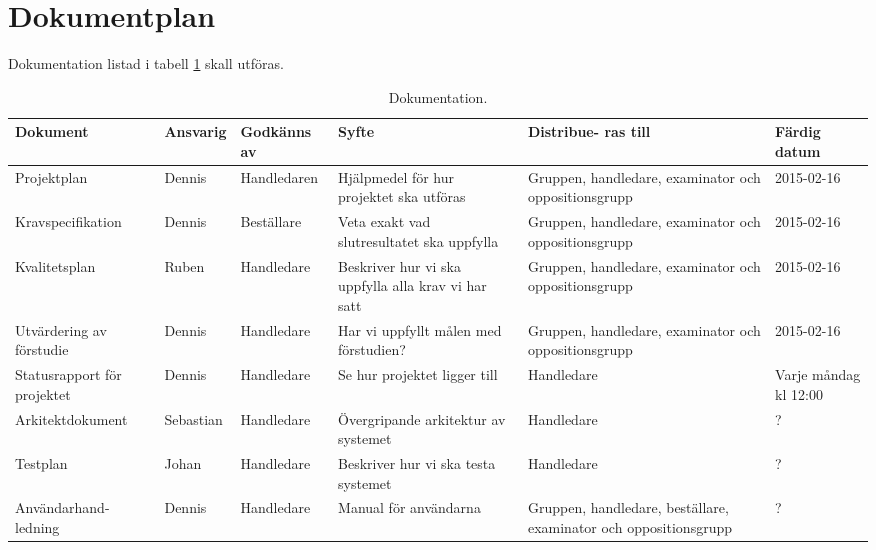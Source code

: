 \section{Dokumentplan}
Dokumentation listad i tabell \ref{dokumentation:tabell} skall utföras.

\begin{table}[H]
	\centering
		\begin{tabularx}{\textwidth}{| p{25mm} | l | X | p{25mm} | X | X |}
			\hline
			\textbf{Dokument} & \textbf{Ansvarig} & \textbf{Godkänns av} & \textbf{Syfte} & \textbf{Distribue-
  ras till} & \textbf{Färdig datum} \\\hline

    		
			{Projektplan} & {Dennis} & {Handledaren} & {Hjälpmedel för hur projektet ska utföras} & {Gruppen, handledare, examinator och oppositionsgrupp} & {2015-02-16} \\\hline
			
			{Kravspecifikation} & {Dennis} & {Beställare} & {Veta exakt vad slutresultatet ska uppfylla} & {Gruppen, handledare, examinator och oppositionsgrupp} & {2015-02-16} \\\hline
			
			{Kvalitetsplan} & {Ruben} & {Handledare} & {Beskriver hur vi ska uppfylla alla krav vi har satt} & {Gruppen, handledare, examinator och oppositionsgrupp} & {2015-02-16} \\\hline
			
						{Utvärdering av förstudie} & {Dennis} & {Handledare} & {Har vi uppfyllt målen med förstudien?} & {Gruppen, handledare, examinator och oppositionsgrupp} & {2015-02-16} \\\hline
			
			{Statusrapport för projektet} & {Dennis} & {Handledare} & {Se hur projektet ligger till} & {Handledare} & {Varje måndag kl 12:00} \\\hline
			
            {Arkitektdokument} & {Sebastian} & {Handledare} & {Övergripande arkitektur av systemet} & {Handledare} & {?} \\\hline
               {Testplan} & {Johan} & {Handledare} & {Beskriver hur vi ska testa systemet} & {Handledare} & {?} \\\hline
			
            {Användarhand-ledning} & {Dennis} & {Handledare} & {Manual för användarna} & {Gruppen, handledare, beställare, examinator och oppositionsgrupp} & {?} \\\hline
            
			
			
		\end{tabularx}
	\caption{Dokumentation.} \label{dokumentation:tabell}
\end{table}
